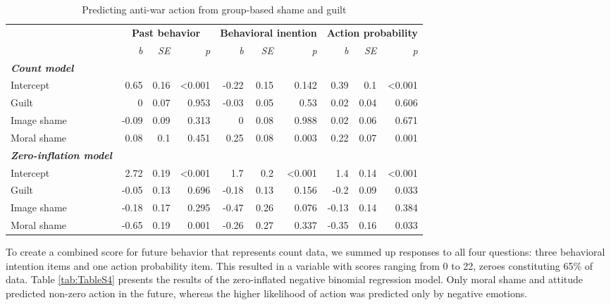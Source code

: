 \documentclass[
]{article}
\begin{document}
\begin{table}[H]

\caption{\label{tab:TableS3}Predicting anti-war action from group-based shame and guilt}
\centering
\fontsize{8}{10}\selectfont
\begin{tabular}[t]{lrrrrrrrrr}
\toprule
\multicolumn{1}{c}{\textbf{}} & \multicolumn{3}{c}{\textbf{Past behavior}} & \multicolumn{3}{c}{\textbf{Behavioral inention}} & \multicolumn{3}{c}{\textbf{Action probability}} \\
\cmidrule(l{3pt}r{3pt}){2-4} \cmidrule(l{3pt}r{3pt}){5-7} \cmidrule(l{3pt}r{3pt}){8-10}
\em{ } & \em{b} & \em{SE} & \em{p} & \em{b} & \em{SE} & \em{p} & \em{b} & \em{SE} & \em{p}\\
\midrule
\em{\textbf{Count model}} & \em{\textbf{}} & \em{\textbf{}} & \em{\textbf{}} & \em{\textbf{}} & \em{\textbf{}} & \em{\textbf{}} & \em{\textbf{}} & \em{\textbf{}} & \em{\textbf{}}\\
\midrule
Intercept & 0.65 & 0.16 & <0.001 & -0.22 & 0.15 & 0.142 & 0.39 & 0.1 & <0.001\\
Guilt & 0 & 0.07 & 0.953 & -0.03 & 0.05 & 0.53 & 0.02 & 0.04 & 0.606\\
Image shame & -0.09 & 0.09 & 0.313 & 0 & 0.08 & 0.988 & 0.02 & 0.06 & 0.671\\
Moral shame & 0.08 & 0.1 & 0.451 & 0.25 & 0.08 & 0.003 & 0.22 & 0.07 & 0.001\\
\midrule
\addlinespace
\em{\textbf{Zero-inflation model}} & \em{\textbf{}} & \em{\textbf{}} & \em{\textbf{}} & \em{\textbf{}} & \em{\textbf{}} & \em{\textbf{}} & \em{\textbf{}} & \em{\textbf{}} & \em{\textbf{}}\\
\midrule
Intercept & 2.72 & 0.19 & <0.001 & 1.7 & 0.2 & <0.001 & 1.4 & 0.14 & <0.001\\
Guilt & -0.05 & 0.13 & 0.696 & -0.18 & 0.13 & 0.156 & -0.2 & 0.09 & 0.033\\
Image shame & -0.18 & 0.17 & 0.295 & -0.47 & 0.26 & 0.076 & -0.13 & 0.14 & 0.384\\
Moral shame & -0.65 & 0.19 & 0.001 & -0.26 & 0.27 & 0.337 & -0.35 & 0.16 & 0.033\\
\bottomrule
\end{tabular}
\end{table}

To create a combined score for future behavior that represents count data, we summed up responses to all four questions: three behavioral intention items and one action probability item. This resulted in a variable with scores ranging from 0 to 22, zeroes constituting 65\% of data. Table \ref{tab:TableS4} presents the results of the zero-inflated negative binomial regression model. Only moral shame and attitude predicted non-zero action in the future, whereas the higher likelihood of action was predicted only by negative emotions.
\end{document}
